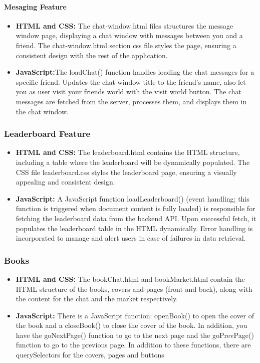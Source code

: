 \documentclass[12pt]{article}
\begin{document}
\paragraph{Mesaging Feature}
\begin{itemize}
    \item \textbf{HTML and CSS:} The chat-window.html files structures the message window page, displaying a chat window with messages between you and a friend. The chat-window.html section css file styles the page, ensuring a consistent design with the rest of the application.
    \item \textbf{JavaScript:}The loadChat() function handles loading the chat messages for a specific friend. Updates the chat window title to the friend's name, also let you as user visit your friends world with the visit world button. The chat messages  are fetched from the server, processes them, and displays them in the chat window.
\end{itemize}

\subsubsection{Leaderboard Feature}
\begin{itemize}
    \item \textbf{HTML and CSS:} The leaderboard.html contains the HTML structure, including a table where the leaderboard will be dynamically populated. The CSS file leaderboard.css styles the leaderboard page, ensuring a visually appealing and consistent design.
    \item \textbf{JavaScript:} A JavaScript function loadLeaderboard() (event handling; this function is triggered when document content is fully loaded) is responsible for fetching the leaderboard data from the backend API. Upon successful fetch, it populates the leaderboard table in the HTML dynamically. Error handling is incorporated to manage and alert users in case of failures in data retrieval.
\end{itemize}

\subsubsection{Books}
\begin{itemize}
    \item \textbf{HTML and CSS:} The bookChat.html and bookMarket.html contain the HTML structure of the books, covers and pages (front and back), along with the content for the chat and the market respectively.
    \item \textbf{JavaScript:} There is a JavaScript function: openBook() to open the cover of the book and a closeBook() to close the cover of the book. In addition, you have the goNextPage() function to go to the next page and the goPrevPage() function to go to the previous page. In addition to these functions, there are querySelectors for the covers, pages and buttons
\end{itemize}
\end{document}
